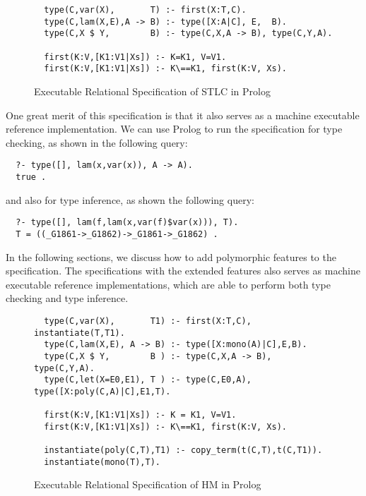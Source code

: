 \documentclass[runningheads,a4paper]{llncs}
\begin{document}
\begin{figure}
\vspace*{-1ex}
\begin{verbatim}
  type(C,var(X),       T) :- first(X:T,C).
  type(C,lam(X,E),A -> B) :- type([X:A|C], E,  B).
  type(C,X $ Y,        B) :- type(C,X,A -> B), type(C,Y,A).

  first(K:V,[K1:V1|Xs]) :- K=K1, V=V1.
  first(K:V,[K1:V1|Xs]) :- K\==K1, first(K:V, Xs). 
\end{verbatim}
\vspace*{-3ex}
\caption{Executable Relational Specification of STLC in Prolog}
\label{fig:STLC}
\vspace*{-1ex}
\end{figure}

One great merit of this specification is that it also serves as
a machine executable reference implementation. We can use Prolog
to run the specification for type checking, as shown in the following query:
\begin{verbatim}
  ?- type([], lam(x,var(x)), A -> A).         
  true .
\end{verbatim}\noindent
and also for type inference, as shown the following query:
\begin{verbatim}
  ?- type([], lam(f,lam(x,var(f)$var(x))), T).
  T = ((_G1861->_G1862)->_G1861->_G1862) .
\end{verbatim}
In the following sections, we discuss how to add polymorphic features
to the specification. The specifications with the extended features
also serves as machine executable reference implementations, which
are able to perform both type checking and type inference.

\begin{figure}
\begin{verbatim}
  type(C,var(X),       T1) :- first(X:T,C), instantiate(T,T1).
  type(C,lam(X,E), A -> B) :- type([X:mono(A)|C],E,B).
  type(C,X $ Y,        B ) :- type(C,X,A -> B), type(C,Y,A).
  type(C,let(X=E0,E1), T ) :- type(C,E0,A), type([X:poly(C,A)|C],E1,T).

  first(K:V,[K1:V1|Xs]) :- K = K1, V=V1.
  first(K:V,[K1:V1|Xs]) :- K\==K1, first(K:V, Xs).
  
  instantiate(poly(C,T),T1) :- copy_term(t(C,T),t(C,T1)).
  instantiate(mono(T),T).
\end{verbatim}
\vspace*{-3ex}
\caption{Executable Relational Specification of HM in Prolog}
\label{fig:HM}
\vspace*{-1ex}
\end{figure}
\end{document}

